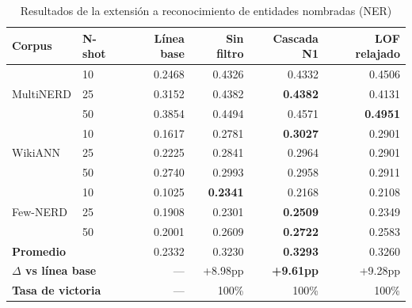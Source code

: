 \begin{table}[htbp]
\centering
\caption{Resultados de la extensión a reconocimiento de entidades nombradas (NER)}
\label{tab:ner_results}
\begin{tabular}{llrrrr}
\toprule
\textbf{Corpus} & \textbf{N-shot} & \textbf{Línea base} & \textbf{Sin filtro} & \textbf{Cascada N1} & \textbf{LOF relajado} \\
\midrule
\multirow{3}{*}{MultiNERD}
 & 10 & 0.2468 & 0.4326 & 0.4332 & 0.4506 \\
 & 25 & 0.3152 & 0.4382 & \textbf{0.4382} & 0.4131 \\
 & 50 & 0.3854 & 0.4494 & 0.4571 & \textbf{0.4951} \\
\midrule
\multirow{3}{*}{WikiANN}
 & 10 & 0.1617 & 0.2781 & \textbf{0.3027} & 0.2901 \\
 & 25 & 0.2225 & 0.2841 & 0.2964 & 0.2901 \\
 & 50 & 0.2740 & 0.2993 & 0.2958 & 0.2911 \\
\midrule
\multirow{3}{*}{Few-NERD}
 & 10 & 0.1025 & \textbf{0.2341} & 0.2168 & 0.2108 \\
 & 25 & 0.1908 & 0.2301 & \textbf{0.2509} & 0.2349 \\
 & 50 & 0.2001 & 0.2609 & \textbf{0.2722} & 0.2583 \\
\midrule
\multicolumn{2}{l}{\textbf{Promedio}} & 0.2332 & 0.3230 & \textbf{0.3293} & 0.3260 \\
\multicolumn{2}{l}{\textbf{$\Delta$ vs línea base}} & --- & +8.98pp & \textbf{+9.61pp} & +9.28pp \\
\multicolumn{2}{l}{\textbf{Tasa de victoria}} & --- & 100\% & 100\% & 100\% \\
\bottomrule
\end{tabular}
\end{table}
